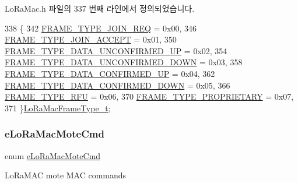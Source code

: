 Lo\+Ra\+Mac.\+h 파일의 337 번째 라인에서 정의되었습니다.


\begin{DoxyCode}
338 \{
342     \mbox{\hyperlink{group___l_o_r_a_m_a_c_gga5e02f214e1a4b8578c415045367c0a11ae01d60e50804065d3564dc1e12d80811}{FRAME\_TYPE\_JOIN\_REQ}}              = 0x00,
346     \mbox{\hyperlink{group___l_o_r_a_m_a_c_gga5e02f214e1a4b8578c415045367c0a11a47ee6b14ec9dfe5ae33773749c30c103}{FRAME\_TYPE\_JOIN\_ACCEPT}}           = 0x01,
350     \mbox{\hyperlink{group___l_o_r_a_m_a_c_gga5e02f214e1a4b8578c415045367c0a11a6701b29296dc0a006f52d51f510a138f}{FRAME\_TYPE\_DATA\_UNCONFIRMED\_UP}}   = 0x02,
354     \mbox{\hyperlink{group___l_o_r_a_m_a_c_gga5e02f214e1a4b8578c415045367c0a11a0309638c699fe7748561e2bac00bd689}{FRAME\_TYPE\_DATA\_UNCONFIRMED\_DOWN}} = 0x03,
358     \mbox{\hyperlink{group___l_o_r_a_m_a_c_gga5e02f214e1a4b8578c415045367c0a11ac64f43487ee770c216c2ee1a829b75ca}{FRAME\_TYPE\_DATA\_CONFIRMED\_UP}}     = 0x04,
362     \mbox{\hyperlink{group___l_o_r_a_m_a_c_gga5e02f214e1a4b8578c415045367c0a11ad9249e47768f5551f2733532da9f3712}{FRAME\_TYPE\_DATA\_CONFIRMED\_DOWN}}   = 0x05,
366     \mbox{\hyperlink{group___l_o_r_a_m_a_c_gga5e02f214e1a4b8578c415045367c0a11a161e7c522a6d16fc5d3efb813f2f1351}{FRAME\_TYPE\_RFU}}                   = 0x06,
370     \mbox{\hyperlink{group___l_o_r_a_m_a_c_gga5e02f214e1a4b8578c415045367c0a11a68dbf0499a1912728cc6a6d1ab328b37}{FRAME\_TYPE\_PROPRIETARY}}           = 0x07,
371 \}\mbox{\hyperlink{group___l_o_r_a_m_a_c_ga3772acf0e9af9869ead480132e733cb2}{LoRaMacFrameType\_t}};
\end{DoxyCode}
\mbox{\label{group___l_o_r_a_m_a_c_gaa56523d6cd76c438d6bc4263b5254d73}} 
\subsubsection{\texorpdfstring{e\+Lo\+Ra\+Mac\+Mote\+Cmd}{eLoRaMacMoteCmd}}
{\footnotesize\ttfamily enum \mbox{\hyperlink{group___l_o_r_a_m_a_c_gaa56523d6cd76c438d6bc4263b5254d73}{e\+Lo\+Ra\+Mac\+Mote\+Cmd}}}

Lo\+Ra\+M\+AC mote M\+AC commands

